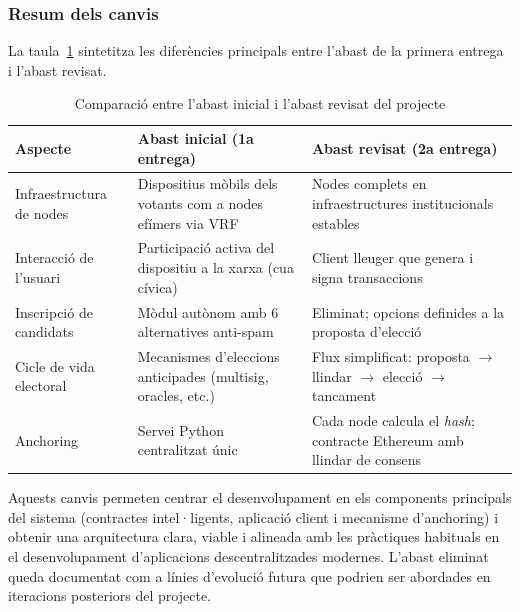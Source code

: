 \subsubsection{Resum dels canvis}

La taula~\ref{tab:comparacio_abast} sintetitza les diferències principals entre l'abast de la primera entrega i l'abast revisat.

\begin{table}[H]
\centering
\small
\begin{tabularx}{\textwidth}{l X X}
\toprule
\textbf{Aspecte} & \textbf{Abast inicial (1a entrega)} & \textbf{Abast revisat (2a entrega)} \\
\midrule
Infraestructura de nodes & Dispositius mòbils dels votants com a nodes efímers via VRF & Nodes complets en infraestructures institucionals estables \\
\addlinespace
Interacció de l'usuari & Participació activa del dispositiu a la xarxa (cua cívica) & Client lleuger que genera i signa transaccions \\
\addlinespace
Inscripció de candidats & Mòdul autònom amb 6 alternatives anti-spam & Eliminat; opcions definides a la proposta d'elecció \\
\addlinespace
Cicle de vida electoral & Mecanismes d'eleccions anticipades (multisig, oracles, etc.) & Flux simplificat: proposta $\rightarrow$ llindar $\rightarrow$ elecció $\rightarrow$ tancament \\
\addlinespace
Anchoring & Servei Python centralitzat únic & Cada node calcula el \textit{hash}; contracte Ethereum amb llindar de consens \\
\bottomrule
\end{tabularx}
\caption{Comparació entre l'abast inicial i l'abast revisat del projecte}
\label{tab:comparacio_abast}
\end{table}

Aquests canvis permeten centrar el desenvolupament en els components principals del sistema (contractes intel·ligents, aplicació client i mecanisme d'anchoring) i obtenir una arquitectura clara, viable i alineada amb les pràctiques habituals en el desenvolupament d'aplicacions descentralitzades modernes. L'abast eliminat queda documentat com a línies d'evolució futura que podrien ser abordades en iteracions posteriors del projecte.
